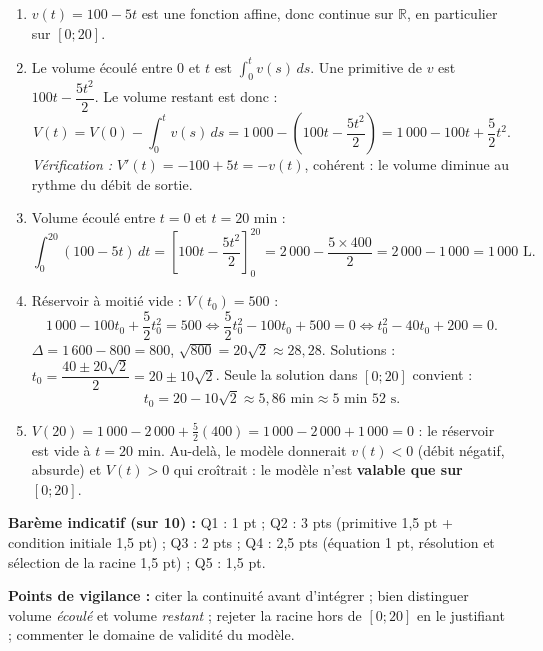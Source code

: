 \documentclass[11pt]{article}
\begin{document}
\begin{corrige}
\begin{enumerate}
    \item $v(t)=100-5t$ est une fonction affine, donc continue sur $\mathbb{R}$, en particulier sur $[0;20]$.
    \item Le volume écoulé entre $0$ et $t$ est $\displaystyle\int_0^t v(s)\,ds$. Une primitive de $v$ est $100t-\dfrac{5t^2}{2}$. Le volume restant est donc :
    \[ V(t) = V(0) - \int_0^t v(s)\,ds = 1\,000 - \left(100t-\frac{5t^2}{2}\right) = 1\,000 - 100t + \frac{5}{2}t^2. \]
    \emph{Vérification :} $V'(t)=-100+5t=-v(t)$, cohérent : le volume diminue au rythme du débit de sortie.
    \item Volume écoulé entre $t=0$ et $t=20$ min :
    \[ \int_0^{20}(100-5t)\,dt = \left[100t-\frac{5t^2}{2}\right]_0^{20} = 2\,000 - \frac{5\times 400}{2} = 2\,000 - 1\,000 = 1\,000 \text{ L}. \]
    \item Réservoir à moitié vide : $V(t_0)=500$ :
    \[ 1\,000 - 100t_0 + \frac{5}{2}t_0^2 = 500 \iff \frac{5}{2}t_0^2 - 100t_0 + 500 = 0 \iff t_0^2 - 40t_0 + 200 = 0. \]
    $\Delta = 1\,600 - 800 = 800$, $\sqrt{800}=20\sqrt{2}\approx 28{,}28$. Solutions : $t_0 = \dfrac{40\pm 20\sqrt{2}}{2}=20\pm 10\sqrt{2}$. Seule la solution dans $[0;20]$ convient :
    \[ t_0 = 20 - 10\sqrt{2} \approx 5{,}86 \text{ min} \approx 5 \text{ min } 52 \text{ s}. \]
    \item $V(20)=1\,000-2\,000+\frac{5}{2}(400)=1\,000-2\,000+1\,000=0$ : le réservoir est vide à $t=20$ min. Au-delà, le modèle donnerait $v(t)<0$ (débit négatif, absurde) et $V(t)>0$ qui croîtrait : le modèle n'est \textbf{valable que sur $[0;20]$}.
\end{enumerate}
\textbf{Barème indicatif (sur 10) :} Q1 : 1 pt ; Q2 : 3 pts (primitive 1,5 pt + condition initiale 1,5 pt) ; Q3 : 2 pts ; Q4 : 2,5 pts (équation 1 pt, résolution et sélection de la racine 1,5 pt) ; Q5 : 1,5 pt.

\textbf{Points de vigilance :} citer la continuité avant d'intégrer ; bien distinguer volume \emph{écoulé} et volume \emph{restant} ; rejeter la racine hors de $[0;20]$ en le justifiant ; commenter le domaine de validité du modèle.
\end{corrige}
\end{document}
